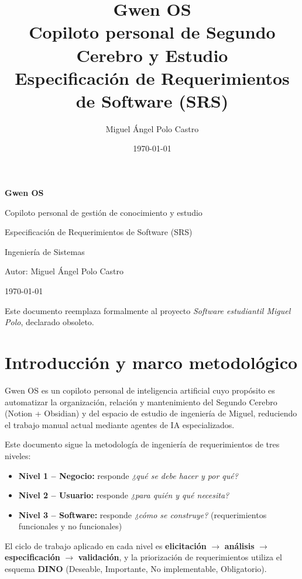 \documentclass[11pt,a4paper]{article}
\title{\textbf{Gwen OS}\\[0.3cm]\Large Copiloto personal de Segundo Cerebro y Estudio\\[0.2cm]\large Especificación de Requerimientos de Software (SRS)}
\author{Miguel Ángel Polo Castro}
\date{\today}
\begin{document}
\begin{titlepage}
\centering
\vspace*{3cm}
{\Huge\bfseries Gwen OS \par}
\vspace{0.5cm}
{\Large Copiloto personal de gestión de conocimiento y estudio \par}
\vspace{1.5cm}
{\large Especificación de Requerimientos de Software (SRS) \par}
\vspace{0.3cm}
{\large Ingeniería de Sistemas \par}
\vspace{3cm}
{\large Autor: Miguel Ángel Polo Castro \par}
\vspace{0.3cm}
{\large \today \par}
\vfill
{\small Este documento reemplaza formalmente al proyecto \emph{Software estudiantil Miguel Polo}, declarado obsoleto. \par}
\end{titlepage}

\tableofcontents
\newpage

\section{Introducción y marco metodológico}

Gwen OS es un copiloto personal de inteligencia artificial cuyo propósito es automatizar la organización, relación y mantenimiento del Segundo Cerebro (Notion + Obsidian) y del espacio de estudio de ingeniería de Miguel, reduciendo el trabajo manual actual mediante agentes de IA especializados.

Este documento sigue la metodología de ingeniería de requerimientos de tres niveles:

\begin{itemize}[leftmargin=1.4cm]
  \item \textbf{Nivel 1 -- Negocio:} responde \emph{¿qué se debe hacer y por qué?}
  \item \textbf{Nivel 2 -- Usuario:} responde \emph{¿para quién y qué necesita?}
  \item \textbf{Nivel 3 -- Software:} responde \emph{¿cómo se construye?} (requerimientos funcionales y no funcionales)
\end{itemize}

El ciclo de trabajo aplicado en cada nivel es \textbf{elicitación} $\rightarrow$ \textbf{análisis} $\rightarrow$ \textbf{especificación} $\rightarrow$ \textbf{validación}, y la priorización de requerimientos utiliza el esquema \textbf{DINO} (Deseable, Importante, No implementable, Obligatorio).
\end{document}
